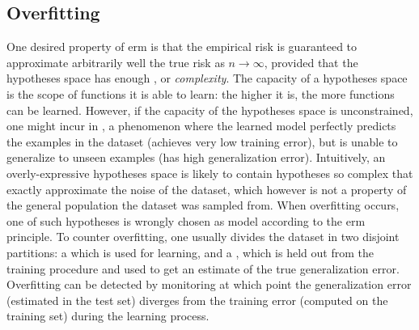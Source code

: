 \subsection{Overfitting}
One desired property of \gls{erm} is that the empirical risk is guaranteed to approximate arbitrarily well the true risk as $n \to \infty$, provided that the hypotheses space has enough , or \emph{complexity}. The capacity of a hypotheses space is the scope of functions it is able to learn: the higher it is, the more  functions can be learned. However, if the capacity of the hypotheses space is unconstrained, one might incur in , a phenomenon where the learned model perfectly predicts the examples in the dataset (achieves very low training error), but is unable to generalize to unseen examples (has high generalization error). Intuitively, an overly-expressive hypotheses space is likely to contain hypotheses so complex that exactly approximate the noise of the dataset, which however is not a property of the general population the dataset was sampled from. When overfitting occurs, one of such hypotheses is wrongly chosen as model according to the \gls{erm} principle. To counter overfitting, one usually divides the dataset in two disjoint partitions: a  which is used for learning, and a , which is held out from the training procedure and used to get an estimate of the true generalization error. Overfitting can be detected by monitoring at which point the generalization error (estimated in the test set) diverges from the training error (computed on the training set) during the learning process.


